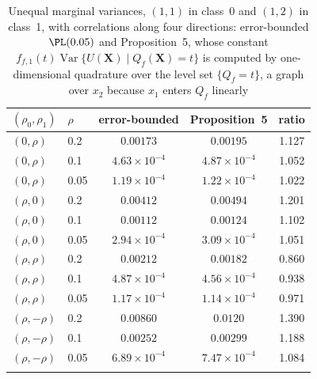 \begin{table}[t]
\caption{Unequal marginal variances, $(1,1)$ in class~0 and $(1,2)$ in class~1, with correlations along four directions: error-bounded $\PL(0.05)$ and Proposition~5, whose constant $f_{f,1}(t)\operatorname{Var}\{U(\bm X)\mid Q_f(\bm X)=t\}$ is computed by one-dimensional quadrature over the level set $\{Q_f=t\}$, a graph over $x_2$ because $x_1$ enters $Q_f$ linearly}\label{tab:weakunequal}
\small
\begin{tabular*}{\textwidth}{@{\extracolsep\fill}llccc@{}}
\toprule
$(\rho_0,\rho_1)$ & $\rho$ & error-bounded & Proposition~5 & ratio\\
\midrule
$(0,\rho)$ & 0.2 & $0.00173$ & $0.00195$ & 1.127\\
$(0,\rho)$ & 0.1 & $4.63\times10^{-4}$ & $4.87\times10^{-4}$ & 1.052\\
$(0,\rho)$ & 0.05 & $1.19\times10^{-4}$ & $1.22\times10^{-4}$ & 1.022\\
\midrule
$(\rho,0)$ & 0.2 & $0.00412$ & $0.00494$ & 1.201\\
$(\rho,0)$ & 0.1 & $0.00112$ & $0.00124$ & 1.102\\
$(\rho,0)$ & 0.05 & $2.94\times10^{-4}$ & $3.09\times10^{-4}$ & 1.051\\
\midrule
$(\rho,\rho)$ & 0.2 & $0.00212$ & $0.00182$ & 0.860\\
$(\rho,\rho)$ & 0.1 & $4.87\times10^{-4}$ & $4.56\times10^{-4}$ & 0.938\\
$(\rho,\rho)$ & 0.05 & $1.17\times10^{-4}$ & $1.14\times10^{-4}$ & 0.971\\
\midrule
$(\rho,-\rho)$ & 0.2 & $0.00860$ & $0.0120$ & 1.390\\
$(\rho,-\rho)$ & 0.1 & $0.00252$ & $0.00299$ & 1.188\\
$(\rho,-\rho)$ & 0.05 & $6.89\times10^{-4}$ & $7.47\times10^{-4}$ & 1.084\\
\botrule
\end{tabular*}
\end{table}
